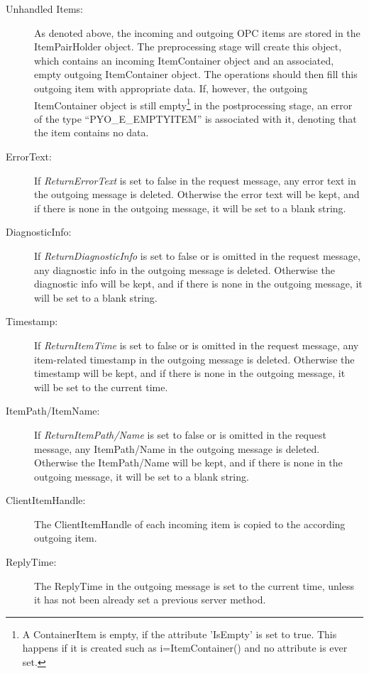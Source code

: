 \begin{description}

\item[Unhandled Items:] As denoted above, the incoming and outgoing
OPC items are stored in the ItemPairHolder object. The preprocessing
stage will create this object, which contains an incoming
ItemContainer object and an associated, empty outgoing ItemContainer
object. The operations should then fill this outgoing item with
appropriate data. If, however, the outgoing ItemContainer object is
still empty\footnote{A ContainerItem is empty, if the attribute
'IsEmpty' is set to true. This happens if it is created such as
i=ItemContainer() and no attribute is ever set.} in the postprocessing
stage, an error of the type ``PYO\_E\_EMPTYITEM'' is associated with
it, denoting that the item contains no data.

\item[ErrorText:] If {\sl ReturnErrorText} is set to false in the
request message, any error text in the outgoing message is
deleted. Otherwise the error text will be kept, and if there is none
in the outgoing message, it will be set to a blank string.
\item[DiagnosticInfo:] If {\sl ReturnDiagnosticInfo} is set to false
or is omitted in the request message, any diagnostic info in the
outgoing message is deleted. Otherwise the diagnostic info will be
kept, and if there is none in the outgoing message, it will be set to
a blank string.
\item[Timestamp:] If {\sl ReturnItemTime} is set to false or is
omitted in the request message, any item-related timestamp in the
outgoing message is deleted. Otherwise the timestamp will be kept,
and if there is none in the outgoing message, it will be set to 
the current time.
\item[ItemPath/ItemName:] If {\sl ReturnItemPath/Name} is set to false
or is omitted in the request message, any ItemPath/Name in the
outgoing message is deleted. Otherwise the ItemPath/Name will be kept,
and if there is none in the outgoing message, it will be set to a
blank string.
\item[ClientItemHandle:] The ClientItemHandle of each incoming item is
copied to the according outgoing item.
\item[ReplyTime:] The ReplyTime in the outgoing message is set to the
current time, unless it has not been already set a previous server
method.

\end{description}

